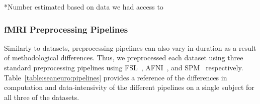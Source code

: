     \begin{table}[t]
      \small\centering
    \footnotesize{*Number estimated based on data we had access to}\\
    \caption{Dataset characteristics. Compressed size is listed as all applications, with the exception of SPM, processed
    compressed data}\label{table:sea-neuro:data}
    \end{table}
    
    
    
    \subsubsection{fMRI Preprocessing Pipelines}
    
    Similarly to datasets, preprocessing pipelines can also vary in duration as a result of methodological differences.
    Thus, we preprocessed each dataset using three standard preprocessing pipelines using FSL~\cite{fsl}, AFNI~\cite{cox1996afni}, and
    SPM~\cite{spm} respectively. Table~\ref{table:seaneuro:pipelines} provides a reference of the differences in computation and data-intensivity
    of the different pipelines on a single subject for all three of the datasets.
    
